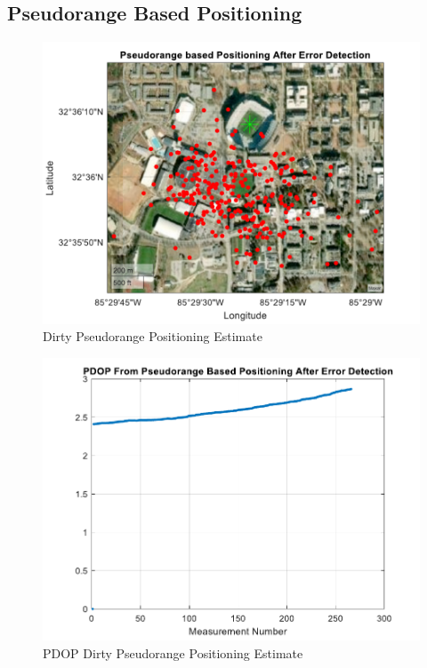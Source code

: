 \documentclass[12pt]{report}
\begin{document}
\subsection{Pseudorange Based Positioning}
\begin{figure}[h!]
    \centering
    \includegraphics[width=5in]
    {15min_irid_dirty_pseudo_posit.pdf}
    \caption{Dirty Pseudorange Positioning Estimate}
    \label{fig:DirtyPseudorange15minIridPosit}
\end{figure}

\begin{figure}[h!]
    \centering
    \includegraphics[width=5in]
    {15min_irid_dirty_pseudo_pdop.pdf}
    \caption{PDOP Dirty Pseudorange Positioning Estimate}
    \label{fig:PDOPDirtyPseudorange15minIridPosit}
\end{figure}
\end{document}
